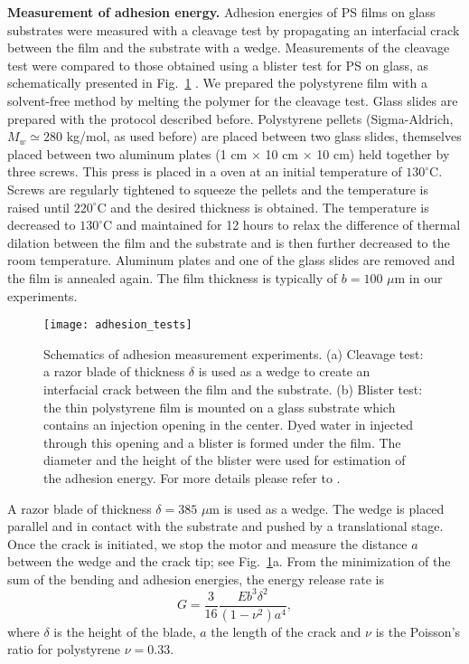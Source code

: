 \documentclass[10pt,twocolumn]{article}
\begin{document}
{\bf {Measurement of adhesion energy.}} Adhesion energies of PS films on glass substrates were measured with a cleavage test by propagating an interfacial crack between the film and the substrate with a wedge.
Measurements of the cleavage test were compared to those obtained using a blister test for PS on glass, as schematically presented in Fig.~\ref{fig:adhesion} \cite{Boulogne2017b}.
We prepared the polystyrene film with a solvent-free method by melting the polymer for the cleavage test.
Glass slides are prepared with the protocol described before.
Polystyrene pellets (Sigma-Aldrich, $M_w \simeq 280$ kg/mol, as used before) are placed between two glass slides, themselves placed between two aluminum plates (1 cm $\times$ 10 cm $\times$ 10 cm) held together by three screws.
This press is placed in a oven at an initial temperature of $130^\circ$C.
Screws are regularly tightened to squeeze the pellets and the temperature is raised until $220^\circ$C and the desired thickness is obtained.
The temperature is decreased to $130^\circ$C and maintained for 12 hours to relax the difference of thermal dilation between the film and the substrate and is then further decreased to the room temperature.
Aluminum plates and one of the glass slides are removed and the film is annealed again.
The film thickness is typically of $b = 100$ $\mu$m in our experiments.

 \begin{figure}[h]
 \center
 \texttt{[image: adhesion\_tests]}%
 \caption{Schematics of adhesion measurement experiments. (a) Cleavage test: a razor blade of thickness $\delta$ is used as a wedge to create an interfacial crack between the film and the substrate. (b) Blister test: the thin polystyrene film is mounted on a glass substrate which contains an injection opening in the center. Dyed water in injected through this opening and a blister is formed under the film. The diameter and the height of the blister were used for estimation of the adhesion energy. For more details please refer to \cite{Boulogne2017b}.}
 \label{fig:adhesion}
 \end{figure}

A razor blade of thickness $\delta=385$ $\mu$m is used as a wedge.
The wedge is placed parallel and in contact with the substrate and pushed by a translational stage.
Once the crack is initiated, we stop the motor and measure the distance $a$ between the wedge and the crack tip; see Fig.~\ref{fig:adhesion}a.
From the minimization of the sum of the bending and adhesion energies, the energy release rate is \cite{Kendall1994}
\begin{equation}\label{eq:adhesion_cleavage}
    G = \frac{3}{16} \frac{E b^3 \delta^2}{(1-\nu^2) a^4},
\end{equation}
where $\delta$ is the height of the blade, $a$ the length of the crack and $\nu$ is the Poisson's ratio for polystyrene $\nu = 0.33$.
\end{document}
